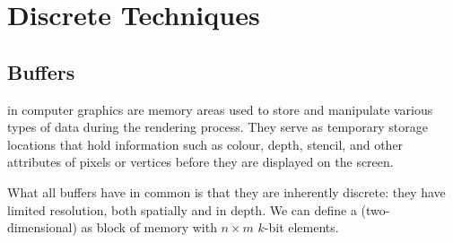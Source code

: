 \documentclass[../COS3712_Notes.tex]{subfiles}
\begin{document}
  \setcounter{chapter}{6}
  \chapter{Discrete Techniques}
    \section{Buffers}

       in computer graphics are memory areas used to store and manipulate
      various types of data during the rendering process.
      They serve as temporary storage locations that hold information such as colour,
      depth, stencil, and other attributes of pixels or vertices before they are displayed
      on the screen.

      What all buffers have in common is that they are inherently discrete:
      they have limited resolution, both spatially and in depth.
      We can define a (two-dimensional)  as block of memory with
      $n \times m$ $k$-bit elements.
\end{document}
